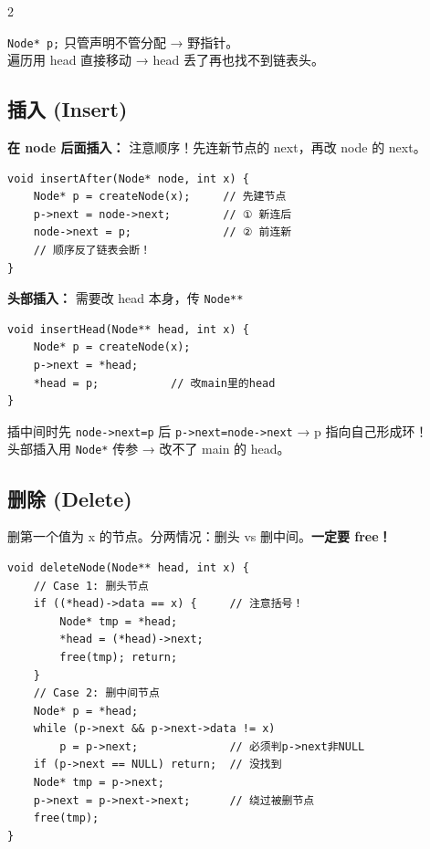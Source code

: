 \documentclass[10pt,a4paper]{article}
\begin{document}
\begin{multicols}{2}
\begin{bugbox}
\texttt{Node* p;} 只管声明不管分配 → 野指针。\\
遍历用 head 直接移动 → head 丢了再也找不到链表头。
\end{bugbox}

\subsection*{插入 (Insert)}

\textbf{在 node 后面插入：} 注意顺序！先连新节点的 next，再改 node 的 next。

\begin{lstlisting}
void insertAfter(Node* node, int x) {
    Node* p = createNode(x);     // 先建节点
    p->next = node->next;        // ① 新连后
    node->next = p;              // ② 前连新
    // 顺序反了链表会断！
}
\end{lstlisting}

\textbf{头部插入：} 需要改 head 本身，传 \texttt{Node**}

\begin{lstlisting}
void insertHead(Node** head, int x) {
    Node* p = createNode(x);
    p->next = *head;
    *head = p;           // 改main里的head
}
\end{lstlisting}

\begin{bugbox}
插中间时先 \texttt{node->next=p} 后 \texttt{p->next=node->next} → p 指向自己形成环！\\
头部插入用 \texttt{Node*} 传参 → 改不了 main 的 head。
\end{bugbox}

\subsection*{删除 (Delete)}

删第一个值为 x 的节点。分两情况：删头 vs 删中间。\textbf{一定要 free！}

\begin{lstlisting}
void deleteNode(Node** head, int x) {
    // Case 1: 删头节点
    if ((*head)->data == x) {     // 注意括号！
        Node* tmp = *head;
        *head = (*head)->next;
        free(tmp); return;
    }
    // Case 2: 删中间节点
    Node* p = *head;
    while (p->next && p->next->data != x)
        p = p->next;              // 必须判p->next非NULL
    if (p->next == NULL) return;  // 没找到
    Node* tmp = p->next;
    p->next = p->next->next;      // 绕过被删节点
    free(tmp);
}
\end{lstlisting}


\end{multicols}
\end{document}
